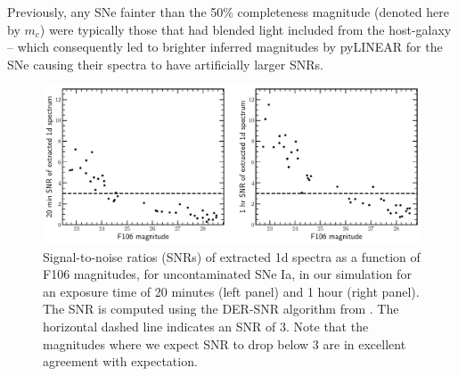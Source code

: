 \documentclass[12pt]{article}
\begin{document}
Previously, any SNe fainter than the 50\% completeness magnitude (denoted here by $m_c$) were typically those that had blended light included from the host-galaxy -- which consequently led to brighter inferred magnitudes by pyLINEAR for the SNe causing their spectra to have artificially larger SNRs.

\begin{figure}
\includegraphics[width=\textwidth]{extracted_snr_short_exptimes.pdf}
\caption{Signal-to-noise ratios (SNRs) of extracted 1d spectra as a function of F106 magnitudes, for uncontaminated SNe Ia, in our simulation for an exposure time of 20 minutes (left panel) and 1 hour (right panel). The SNR is computed using the DER-SNR algorithm from \citet{Stoehr2008}. The horizontal dashed line indicates an SNR of 3. Note that the magnitudes where we expect SNR to drop below 3 are in excellent agreement with expectation.}
\label{fig:snr}
\end{figure}
\end{document}

